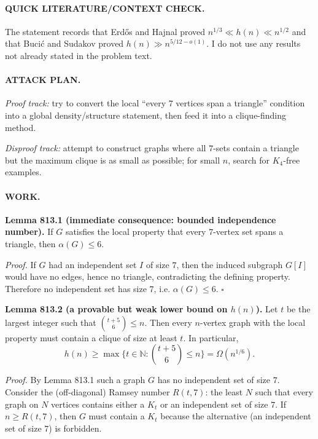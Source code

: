 \paragraph{QUICK LITERATURE/CONTEXT CHECK.}
The statement records that Erd\H{o}s and Hajnal proved $n^{1/3}\ll h(n)\ll n^{1/2}$ and that Buci\'c and Sudakov proved $h(n)\gg n^{5/12-o(1)}$. I do not use any results not already stated in the problem text.

\paragraph{ATTACK PLAN.}
\emph{Proof track:} try to convert the local ``every $7$ vertices span a triangle'' condition into a global density/structure statement, then feed it into a clique-finding method.

\emph{Disproof track:} attempt to construct graphs where all $7$-sets contain a triangle but the maximum clique is as small as possible; for small $n$, search for $K_4$-free examples.

\paragraph{WORK.}
\textbf{Lemma 813.1 (immediate consequence: bounded independence number).}
If $G$ satisfies the local property that every $7$-vertex set spans a triangle, then $\alpha(G)\le 6$.

\emph{Proof.}
If $G$ had an independent set $I$ of size $7$, then the induced subgraph $G[I]$ would have no edges, hence no triangle, contradicting the defining property.
Therefore no independent set has size $7$, i.e. $\alpha(G)\le 6$.
\hfill $\square$

\textbf{Lemma 813.2 (a provable but weak lower bound on $h(n)$).}
Let $t$ be the largest integer such that $\binom{t+5}{6}\le n$. Then every $n$-vertex graph with the local property must contain a clique of size at least $t$. In particular,
\[
h(n) \ge \max\{t\in\mathbb{N}: \binom{t+5}{6}\le n\} = \Omega(n^{1/6}).
\]

\emph{Proof.}
By Lemma 813.1 such a graph $G$ has no independent set of size $7$.
Consider the (off-diagonal) Ramsey number $R(t,7)$: the least $N$ such that every graph on $N$ vertices contains either a $K_t$ or an independent set of size $7$.
If $n\ge R(t,7)$, then $G$ must contain a $K_t$ because the alternative (an independent set of size $7$) is forbidden.


